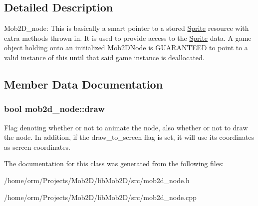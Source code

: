 \subsection{Detailed Description}
Mob2D\_\-node: This is basically a smart pointer to a stored \hyperlink{classSprite}{Sprite} resource with extra methods thrown in. It is used to provide access to the \hyperlink{classSprite}{Sprite} data. A game object holding onto an initialized Mob2DNode is GUARANTEED to point to a valid instance of this until that said game instance is deallocated. 

\subsection{Member Data Documentation}
\hypertarget{classmob2d__node_ae43d11a45a33e0d7850b24fc71a9ef86}{
\subsubsection[{draw}]{\setlength{\rightskip}{0pt plus 5cm}bool {\bf mob2d\_\-node::draw}}}
\label{classmob2d__node_ae43d11a45a33e0d7850b24fc71a9ef86}
Flag denoting whether or not to animate the node, also whether or not to draw the node. In addition, if the draw\_\-to\_\-screen flag is set, it will use its coordinates as screen coordinates. 

The documentation for this class was generated from the following files:\begin{DoxyCompactItemize}
\item 
/home/orm/Projects/Mob2D/libMob2D/src/mob2d\_\-node.h\item 
/home/orm/Projects/Mob2D/libMob2D/src/mob2d\_\-node.cpp\end{DoxyCompactItemize}
